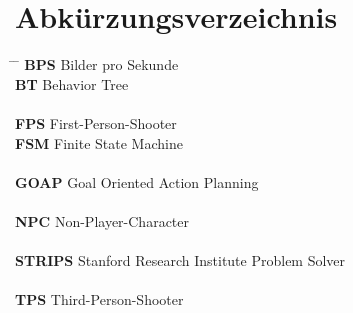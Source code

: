 \chapter*{Abkürzungsverzeichnis}

\begin{tabbing}
    \hspace{3cm} \= \hspace{8cm} \= \kill
    \textbf{BPS}  \> Bilder pro Sekunde \\
    \textbf{BT}   \> Behavior Tree \\
		\\
    \textbf{FPS}  \> First-Person-Shooter \\
    \textbf{FSM}  \> Finite State Machine \\
		\\
    \textbf{GOAP} \> Goal Oriented Action Planning \\
		\\
    \textbf{NPC}  \> Non-Player-Character \\
		\\
		\textbf{STRIPS}  \> Stanford Research Institute Problem Solver \\
		\\
    \textbf{TPS}  \> Third-Person-Shooter \\
		
\end{tabbing}
